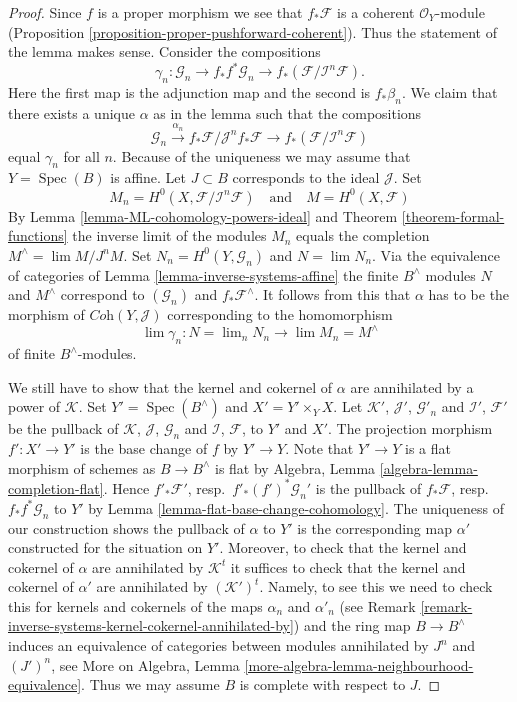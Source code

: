 \documentclass{stacks-project}
\theoremstyle{plain}
\theoremstyle{definition}
\theoremstyle{remark}
\numberwithin{equation}{subsection}
\def\lim{\mathop{\mathrm{lim}}\nolimits}
\def\Spec{\mathop{\mathrm{Spec}}}
\begin{document}
\begin{proof}
Since $f$ is a proper morphism we see that $f_*\mathcal{F}$
is a coherent $\mathcal{O}_Y$-module
(Proposition \ref{proposition-proper-pushforward-coherent}).
Thus the statement of the lemma makes sense.
Consider the compositions
$$
\gamma_n : \mathcal{G}_n \to
f_*f^*\mathcal{G}_n \to
f_*(\mathcal{F}/\mathcal{I}^n\mathcal{F}).
$$
Here the first map is the adjunction map and the second is $f_*\beta_n$.
We claim that there exists a unique $\alpha$ as in the lemma
such that the compositions
$$
\mathcal{G}_n \xrightarrow{\alpha_n}
f_*\mathcal{F}/\mathcal{J}^nf_*\mathcal{F} \to
f_*(\mathcal{F}/\mathcal{I}^n\mathcal{F})
$$
equal $\gamma_n$ for all $n$. Because of the uniqueness we may assume
that $Y = \Spec(B)$ is affine. Let $J \subset B$ corresponds to the
ideal $\mathcal{J}$. Set
$$
M_n = H^0(X, \mathcal{F}/\mathcal{I}^n\mathcal{F})
\quad\text{and}\quad
M = H^0(X, \mathcal{F})
$$
By Lemma \ref{lemma-ML-cohomology-powers-ideal} and
Theorem \ref{theorem-formal-functions}
the inverse limit of the modules
$M_n$ equals the completion $M^\wedge = \lim M/J^nM$.
Set $N_n = H^0(Y, \mathcal{G}_n)$ and $N = \lim N_n$.
Via the equivalence of categories of
Lemma \ref{lemma-inverse-systems-affine}
the finite $B^\wedge$ modules $N$ and $M^\wedge$ correspond
to $(\mathcal{G}_n)$ and $f_*\mathcal{F}^\wedge$.
It follows from this that $\alpha$ has to be the morphism of
$\textit{Coh}(Y, \mathcal{J})$ corresponding to the homomorphism
$$
\lim \gamma_n : N = \lim_n N_n \longrightarrow \lim M_n = M^\wedge
$$
of finite $B^\wedge$-modules.

\medskip\noindent
We still have to show that the kernel and cokernel of $\alpha$ are
annihilated by a power of $\mathcal{K}$. Set $Y' = \Spec(B^\wedge)$
and $X' = Y' \times_Y X$. Let $\mathcal{K}'$, $\mathcal{J}'$, $\mathcal{G}'_n$
and $\mathcal{I}'$, $\mathcal{F}'$ be the pullback of
$\mathcal{K}$, $\mathcal{J}$, $\mathcal{G}_n$ and
$\mathcal{I}$, $\mathcal{F}$, to $Y'$ and $X'$.
The projection morphism $f' : X' \to Y'$ is the base change of
$f$ by $Y' \to Y$. Note that $Y' \to Y$ is a flat morphism of schemes
as $B \to B^\wedge$ is flat by
Algebra, Lemma \ref{algebra-lemma-completion-flat}.
Hence $f'_*\mathcal{F}'$, resp.\ $f'_*(f')^*\mathcal{G}_n'$
is the pullback of $f_*\mathcal{F}$, resp.\ $f_*f^*\mathcal{G}_n$
to $Y'$ by Lemma \ref{lemma-flat-base-change-cohomology}.
The uniqueness of our construction shows the pullback of $\alpha$ to $Y'$
is the corresponding map $\alpha'$ constructed for the situation on $Y'$.
Moreover, to check that the kernel and cokernel of $\alpha$ are
annihilated by $\mathcal{K}^t$ it suffices to check that the
kernel and cokernel of $\alpha'$ are annihilated by
$(\mathcal{K}')^t$. Namely, to see this we need to check this for
kernels and cokernels of the maps $\alpha_n$ and $\alpha'_n$
(see Remark \ref{remark-inverse-systems-kernel-cokernel-annihilated-by})
and the ring map $B \to B^\wedge$ induces
an equivalence of categories between modules annihilated by
$J^n$ and $(J')^n$, see
More on Algebra, Lemma \ref{more-algebra-lemma-neighbourhood-equivalence}.
Thus we may assume $B$ is complete with respect to $J$.


\end{proof}
\end{document}
